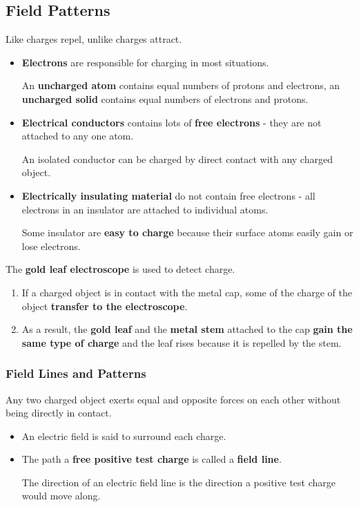 \subsection{Field Patterns}

Like charges repel, unlike charges attract.

\begin{itemize}
    \item \textbf{Electrons} are responsible for charging in most situations.

        An \textbf{uncharged atom} contains equal numbers of protons and electrons, an \textbf{uncharged solid} contains equal numbers of electrons and protons.
    \item \textbf{Electrical conductors} contains lots of \textbf{free electrons} - they are not attached to any one atom.

        An isolated conductor can be charged by direct contact with any charged object.
    \item \textbf{Electrically insulating material} do not contain free electrons - all electrons in an insulator are attached to individual atoms.

        Some insulator are \textbf{easy to charge} because their surface atoms easily gain or lose electrons.
\end{itemize}

The \textbf{gold leaf electroscope} is used to detect charge.
\begin{enumerate}
    \item If a charged object is in contact with the metal cap, some of the charge of the object \textbf{transfer to the electroscope}.
    \item As a result, the \textbf{gold leaf} and the \textbf{metal stem} attached to the cap \textbf{gain the same type of charge} and the leaf rises because it is repelled by the stem.
\end{enumerate}

\subsubsection*{Field Lines and Patterns}

Any two charged object exerts equal and opposite forces on each other without being directly in contact.
\begin{itemize}
    \item An electric field is said to surround each charge.
    \item The path a \textbf{free positive test charge} is called a \textbf{field line}.

        The direction of an electric field line is the direction a positive test charge would move along.
\end{itemize}
